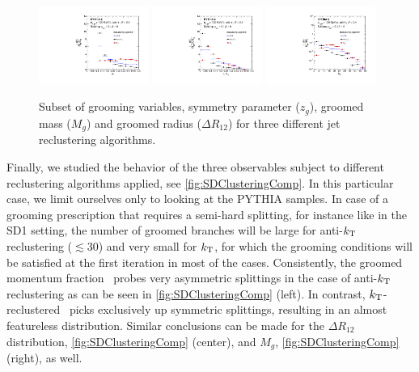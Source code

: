 \begin{figure}[th]
\centering
\includegraphics[width=0.32\textwidth]
{figures/SDAlgorithms/zgClusteringComp.pdf}
\includegraphics[width=0.32\textwidth]
{figures/SDAlgorithms/rgClusteringComp.pdf}
\includegraphics[width=0.32\textwidth]
{figures/SDAlgorithms/mgClusteringComp.pdf}%
\caption{Subset of grooming variables, symmetry parameter ($z_{g}$), groomed mass ($M_{g}$) and groomed radius ($\Delta R_{12}$) for three different jet reclustering algorithms.}
\label{fig:SDClusteringComp}
\end{figure}
Finally, we studied the behavior of the three observables subject to different reclustering algorithms applied, see \autoref{fig:SDClusteringComp}. In this particular case, we limit ourselves only to looking at the PYTHIA samples.
In case of a grooming prescription that requires a semi-hard splitting, for instance like in the SD1 setting,
the number of groomed branches will be large for anti-$k_{\rm \tiny T}$ reclustering ($\lesssim 30$) and very small for $k_{\rm \tiny T}$, for which the grooming conditions will be satisfied at the first iteration in most of the cases. Consistently, the groomed momentum fraction \zg\, probes very asymmetric splittings in the case of anti-$k_{\rm \tiny T}$ reclustering as can be seen in \autoref{fig:SDClusteringComp} (left). In contrast, $k_{\rm \tiny T}$-reclustered \zg\, picks exclusively up symmetric splittings, resulting in an almost featureless distribution. Similar conclusions can be made for the $\Delta R_{12}$ distribution, \autoref{fig:SDClusteringComp} (center), and $M_g$, \autoref{fig:SDClusteringComp} (right), as well.

